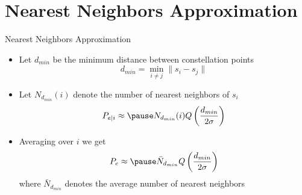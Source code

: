 \documentclass[t]{beamer}
\begin{document}
\section{Nearest Neighbors Approximation}
\begin{frame}{Nearest Neighbors Approximation}
  \footnotesize
  \begin{itemize}
    \item Let $d_{min}$ be the minimum distance between constellation points
      \begin{equation*}
        d_{min} = \min_{i \neq j} \lVert s_i - s_j \rVert
      \end{equation*}
    \item \pause Let $N_{d_{min}}(i)$ denote the number of nearest neighbors of $s_i$
      \begin{equation*}
        P_{e|i}  \approx \pause N_{d_{min}}(i) Q\left(\frac{d_{min}}{2\sigma} \right)
      \end{equation*}
    \item \pause Averaging over $i$ we get
      \begin{eqnarray*}
        P_e \approx \pause \bar{N}_{d_{min}} Q\left(\frac{d_{min}}{2\sigma} \right)
      \end{eqnarray*}
      where $\bar{N}_{d_{min}}$ denotes the average number of nearest neighbors
  \end{itemize}
  \normalsize
\end{frame}
\end{document}
